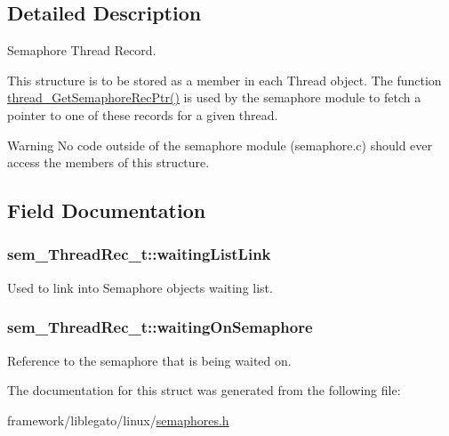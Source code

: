 \subsection{Detailed Description}
Semaphore Thread Record.

This structure is to be stored as a member in each Thread object. The function \hyperlink{thread_8c_a6c762c01422a1032a7dc704f35ddde01}{thread\+\_\+\+Get\+Semaphore\+Rec\+Ptr()} is used by the semaphore module to fetch a pointer to one of these records for a given thread.

\begin{DoxyWarning}{Warning}
No code outside of the semaphore module (semaphore.\+c) should ever access the members of this structure. 
\end{DoxyWarning}


\subsection{Field Documentation}
\subsubsection[{\texorpdfstring{waiting\+List\+Link}{waitingListLink}}]{ sem\+\_\+\+Thread\+Rec\+\_\+t\+::waiting\+List\+Link}\hypertarget{structsem___thread_rec__t_abedbcd352d31de69c76877a8db79c6c7}{}\label{structsem___thread_rec__t_abedbcd352d31de69c76877a8db79c6c7}


Used to link into Semaphore object\textquotesingle{}s waiting list. 

\subsubsection[{\texorpdfstring{waiting\+On\+Semaphore}{waitingOnSemaphore}}]{ sem\+\_\+\+Thread\+Rec\+\_\+t\+::waiting\+On\+Semaphore}\hypertarget{structsem___thread_rec__t_a11de598ac838248b7c43729f9d869315}{}\label{structsem___thread_rec__t_a11de598ac838248b7c43729f9d869315}


Reference to the semaphore that is being waited on. 



The documentation for this struct was generated from the following file\+:\begin{DoxyCompactItemize}
\item 
framework/liblegato/linux/\hyperlink{semaphores_8h}{semaphores.\+h}\end{DoxyCompactItemize}
